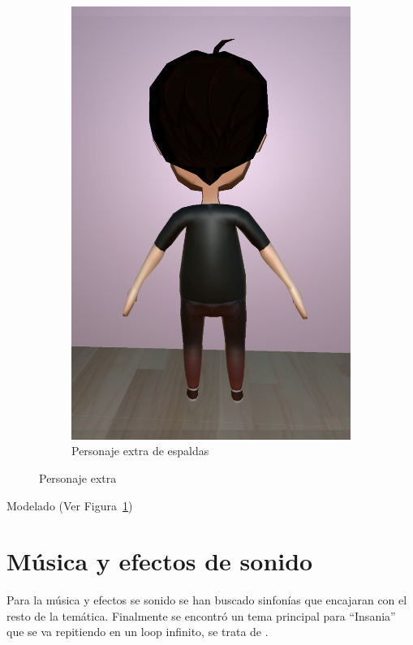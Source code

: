 \documentclass[12pt, a4paper,twoside,titlepage]{book}
\begin{document}
\begin{figure}[tb]
\begin{subfigure}{.5\textwidth}
  \includegraphics[width=.95\linewidth]{TGF/Artes/EVIL_back.png}
  \caption{Personaje extra de espaldas}
\end{subfigure}
\caption{Personaje extra}
\label{fig:ArtesEVIL2}
\end{figure}

 Modelado (Ver Figura~\ref{fig:ArtesEVIL2})



 \section{Música y efectos de sonido}

Para la música y efectos se sonido se han buscado sinfonías que encajaran con el resto de la temática. Finalmente se encontró un tema principal para ``Insania'' que se va repitiendo en un loop infinito, se trata de . 
\end{document}
